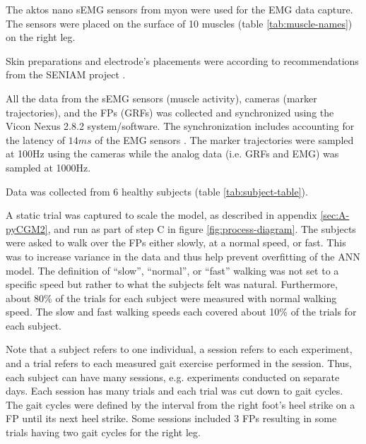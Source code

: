 \documentclass[../main.tex]{subfiles}
\begin{document}
The aktos nano \ac{sEMG} sensors from myon were used for the \ac{EMG} data capture. 
The sensors were placed on the surface of 10 muscles (table \ref{tab:muscle-names}) on the right leg.

Skin preparations and electrode's placements were according to recommendations from the SENIAM project \cite{Stegeman2007, Hermens1999, Hermens2000}. 

All the data from the \ac{sEMG} sensors (muscle activity), cameras (marker trajectories), and the \acp{FP} (\acp{GRF}) was collected and synchronized using the Vicon Nexus 2.8.2 system/software.
The synchronization includes accounting for the latency of $14ms$ of the \ac{EMG} sensors \cite{aktosEMG}.
The marker trajectories were sampled at 100Hz using the cameras while the analog data (i.e. \acp{GRF} and \ac{EMG}) was sampled at 1000Hz.

Data was collected from 6 healthy subjects (table \ref{tab:subject-table}).

%
A static trial was captured to scale the model, as described in appendix \ref{sec:A-pyCGM2}, and run as part of step C in figure \ref{fig:process-diagram}.
The subjects were asked to walk over the \acp{FP} either slowly, at a normal speed, or fast.
This was to increase variance in the data and thus help prevent overfitting of the \ac{ANN} model.
The definition of ``slow'', ``normal'', or ``fast'' walking was not set to a specific speed but rather to what the subjects felt was natural.
Furthermore, about 80\% of the trials for each subject were measured with normal walking speed.
The slow and fast walking speeds each covered about 10\% of the trials for each subject.

Note that a subject refers to one individual, a session refers to each experiment, and a trial refers to each measured gait exercise performed in the session. 
Thus, each subject can have many sessions, e.g. experiments conducted on separate days.
Each session has many trials and each trial was cut down to gait cycles. 
The gait cycles were defined by the interval from the right foot's heel strike on a \ac{FP} until its next heel strike.
Some sessions included 3 \acp{FP} resulting in some trials having two gait cycles for the right leg.
\end{document}
